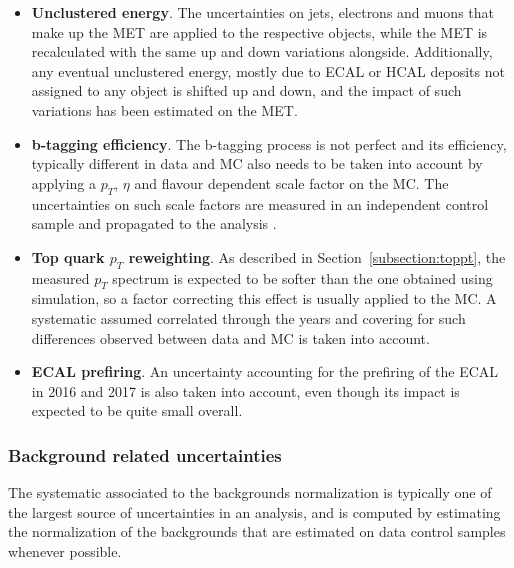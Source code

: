 \documentclass[a4paper, 10pt, openright]{report}
\begin{document}
\begin{itemize}
\item \textbf{Unclustered energy}. The uncertainties on jets, electrons and muons that make up the \ac{MET} are applied to the respective objects, while the \ac{MET} is recalculated with the same up  and down variations alongside. Additionally, any eventual unclustered energy, mostly due to \ac{ECAL} or \ac{HCAL} deposits not assigned to any object is shifted up and down, and the impact of such variations has been estimated on the \ac{MET}.
\item \textbf{b-tagging efficiency}. The b-tagging process is not perfect and its efficiency, typically different in data and \ac{MC} also needs to be taken into account by applying a $p_T$, $\eta$ and flavour dependent scale factor on the \ac{MC}. The uncertainties on such scale factors are measured in an independent control sample and propagated to the analysis \cite{btagEff}.
\item \textbf{Top quark $p_T$ reweighting}. As described in Section~\ref{subsection:toppt}, the measured $p_T$ spectrum is expected to be softer than the one obtained using simulation, so a factor correcting this effect is usually applied to the \ac{MC}. A systematic assumed correlated through the years and covering for such differences observed between data and \ac{MC} is taken into account.
\item \textbf{\ac{ECAL} prefiring}. An uncertainty accounting for the prefiring of the \ac{ECAL} in 2016 and 2017 is also taken into account, even though its impact is expected to be quite small overall.
\end{itemize}

\subsubsection{Background related uncertainties}

The systematic associated to the backgrounds normalization is typically one of the largest source of uncertainties in an analysis, and is computed by estimating the normalization of the backgrounds that are estimated on data control samples whenever possible. 
\end{document}
